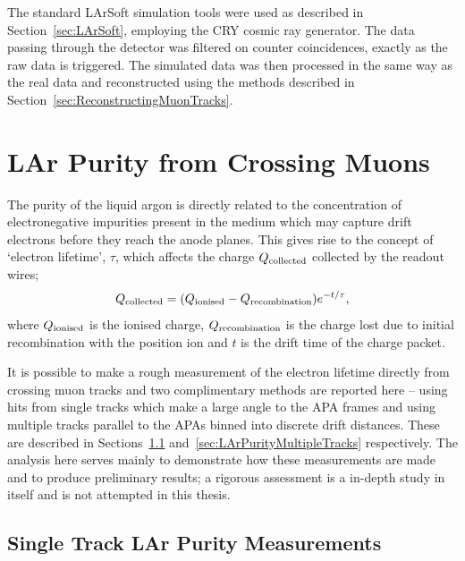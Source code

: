 The standard LArSoft simulation tools were used as described in Section~\ref{sec:LArSoft}, employing the CRY cosmic ray generator.  The data passing through the detector was filtered on counter coincidences, exactly as the raw data is triggered.  The simulated data was then processed in the same way as the real data and reconstructed using the methods described in Section~\ref{sec:ReconstructingMuonTracks}.

\section{LAr Purity from Crossing Muons}\label{sec:PurityAnalysis}

The purity of the liquid argon is directly related to the concentration of electronegative impurities present in the medium which may capture drift electrons before they reach the anode planes.  This gives rise to the concept of `electron lifetime', $\tau$, which affects the charge $Q_{\textnormal{collected}}$ collected by the readout wires;
\begin{equation}\label{eq:ElectronLifetime}
Q_{\textnormal{collected}} = (Q_{\textnormal{ionised}} - Q_{\textnormal{recombination}}) e^{-t/\tau},
\end{equation}
where $Q_{\textnormal{ionised}}$ is the ionised charge, $Q_{\textnormal{recombination}}$ is the charge lost due to initial recombination with the position ion and $t$ is the drift time of the charge packet.

It is possible to make a rough measurement of the electron lifetime directly from crossing muon tracks and two complimentary methods are reported here -- using hits from single tracks which make a large angle to the APA frames and using multiple tracks parallel to the APAs binned into discrete drift distances.  These are described in Sections~\ref{sec:LArPuritySingleTrack} and~\ref{sec:LArPurityMultipleTracks} respectively.  The analysis here serves mainly to demonstrate how these measurements are made and to produce preliminary results; a rigorous assessment is a in-depth study in itself and is not attempted in this thesis.

\subsection{Single Track LAr Purity Measurements}\label{sec:LArPuritySingleTrack}

